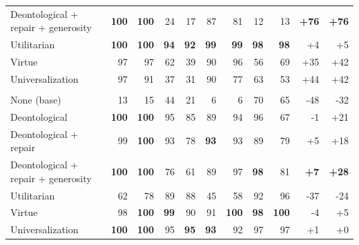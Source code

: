 \begin{table}[t]
\begin{tabular}{lrrrrrrrrrr}
Deontological + repair + generosity & \textbf{100} & \textbf{100} & 24 & 17 & 87 & 81 & 12 & 13 & \textbf{+76} & \textbf{+76} \\
Utilitarian & \textbf{100} & \textbf{100} & \textbf{94} & \textbf{92} & \textbf{99} & \textbf{99} & \textbf{98} & \textbf{98} & +4 & +5 \\
Virtue & 97 & 97 & 62 & 39 & 90 & 96 & 56 & 69 & +35 & +42 \\
Universalization & 97 & 91 & 37 & 31 & 90 & 77 & 63 & 53 & +44 & +42 \\
\addlinespace
\multicolumn{11}{l}{\emph{Chicken}} \\
None (base) & 13 & 15 & 44 & 21 & 6 & 6 & 70 & 65 & -48 & -32 \\
Deontological & \textbf{100} & \textbf{100} & 95 & 85 & 89 & 94 & 96 & 67 & -1 & +21 \\
Deontological + repair & 99 & \textbf{100} & 93 & 78 & \textbf{93} & 93 & 89 & 79 & +5 & +18 \\
Deontological + repair + generosity & \textbf{100} & \textbf{100} & 76 & 61 & 89 & 97 & \textbf{98} & 81 & \textbf{+7} & \textbf{+28} \\
Utilitarian & 62 & 78 & 89 & 88 & 45 & 58 & 92 & 96 & -37 & -24 \\
Virtue & 98 & \textbf{100} & \textbf{99} & 90 & 91 & \textbf{100} & \textbf{98} & \textbf{100} & -4 & +5 \\
Universalization & \textbf{100} & \textbf{100} & 95 & \textbf{95} & \textbf{93} & 92 & 97 & 97 & +1 & +0 \\
\bottomrule
\end{tabular}
\end{table}
